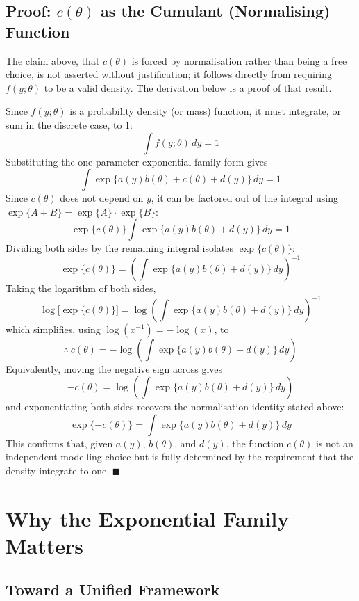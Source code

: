 \documentclass[12pt,a4paper]{report}
\begin{document}
\subsection*{Proof: $c(\theta)$ as the Cumulant (Normalising) Function}

The claim above, that $c(\theta)$ is forced by normalisation rather than being a free choice, is not asserted without justification; it follows directly from requiring $f(y;\theta)$ to be a valid density. The derivation below is a proof of that result.

Since $f(y;\theta)$ is a probability density (or mass) function, it must integrate, or sum in the discrete case, to 1:
\[
\int f(y;\theta)\, dy = 1
\]
Substituting the one-parameter exponential family form gives
\[
\int \exp\{a(y)b(\theta) + c(\theta) + d(y)\}\, dy = 1
\]
Since $c(\theta)$ does not depend on $y$, it can be factored out of the integral using $\exp\{A+B\} = \exp\{A\}\cdot\exp\{B\}$:
\[
\exp\{c(\theta)\} \int \exp\{a(y)b(\theta) + d(y)\}\, dy = 1
\]
Dividing both sides by the remaining integral isolates $\exp\{c(\theta)\}$:
\[
\exp\{c(\theta)\} = \left( \int \exp\{a(y)b(\theta) + d(y)\}\, dy \right)^{-1}
\]
Taking the logarithm of both sides,
\[
\log\big[\exp\{c(\theta)\}\big] = \log\left( \int \exp\{a(y)b(\theta) + d(y)\}\, dy \right)^{-1}
\]
which simplifies, using $\log(x^{-1}) = -\log(x)$, to
\[
\therefore\ c(\theta) = -\log\left( \int \exp\{a(y)b(\theta) + d(y)\}\, dy \right)
\]
Equivalently, moving the negative sign across gives
\[
-c(\theta) = \log\left( \int \exp\{a(y)b(\theta) + d(y)\}\, dy \right)
\]
and exponentiating both sides recovers the normalisation identity stated above:
\[
\exp\{-c(\theta)\} = \int \exp\{a(y)b(\theta) + d(y)\}\, dy
\]
This confirms that, given $a(y)$, $b(\theta)$, and $d(y)$, the function $c(\theta)$ is not an independent modelling choice but is fully determined by the requirement that the density integrate to one. $\blacksquare$

\section{Why the Exponential Family Matters}

\subsection*{Toward a Unified Framework}
\end{document}
